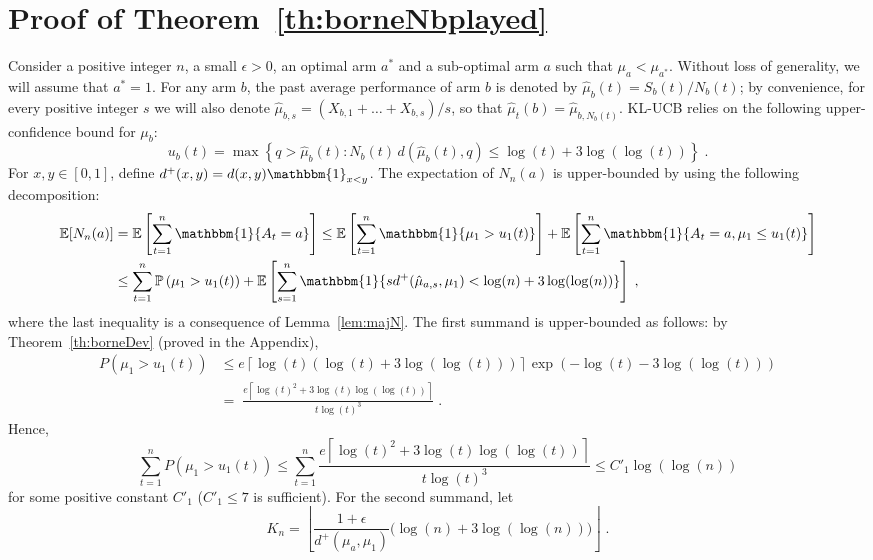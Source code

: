\documentclass[wcp]{jmlr}
\newcommand{\E}{\mathbb{E}}
\renewcommand{\P}{\mathbb{P}}
\newcommand{\1}{\mathbbm{1}}
\begin{document}
{\section{Proof of Theorem~\ref{th:borneNbplayed}}\label{sec:proof}
Consider a positive integer $n$, a small $\epsilon>0$, an optimal arm $a^*$ and
a sub-optimal arm $a$ such that $\mu_a < \mu_{a^*}$.  Without loss of
generality, we will assume that $a^* = 1$. For any arm $b$, the past average performance of arm $b$ is denoted
by $\hat{\mu}_b(t) = S_b(t) / N_b(t)$; by convenience, for every positive
integer $s$ we will also denote $\hat{\mu}_{b,s} = \left( X_{b,1} + \dots +
  X_{b,s} \right)/s$, so that $\hat{\mu}_t(b) = \hat{\mu}_{b,N_b(t)}$. KL-UCB
relies on the following upper-confidence bound for $\mu_b$:
\[u_b(t) = \max \left\{q>\hat{\mu}_b(t) : N_b(t)\,d\left( \hat{\mu}_b(t), q
  \right) \leq \log(t) + 3\log(\log(t))\right\}\;.\]
For $x,y\in[0,1]$, define $d^+(x,y) = d(x,y)\1_{x<y}$.
The expectation of $N_n(a)$ is upper-bounded by using the following
decomposition:
\begin{align*}
  \E[N_n(a)] & = \E\left[\sum_{t=1}^n \1\{A_t = a\}\right]\leq \E\left[\sum_{t=1}^n \1\{\mu_1>u_1(t)\}\right] + \E\left[\sum_{t=1}^n \1\{A_t = a, \mu_1\leq u_1(t)\}\right] \\
  & \leq \sum_{t=1}^n \P\left(\mu_1>u_1(t)\right) + \E\left[ \sum_{s = 1}^n
    \1\{ sd^+(\hat{\mu}_{a,s}, \mu_1) < \log(n) + 3\log(\log(n))\}\right]\;,
\end{align*}
where the last inequality is a consequence of Lemma~\ref{lem:majN}.  The first
summand is upper-bounded as
follows: %
by Theorem~\ref{th:borneDev} (proved in the Appendix),
\begin{align*}
  P(\mu_1>u_1(t))& \leq e\left\lceil \log(t)\left( \log(t) + 3\log(\log(t))
    \right)\right\rceil \exp(-\log(t) - 3\log(\log(t))) \\&= \;
  \frac{e\left\lceil \log(t)^2 + 3\log(t)\log(\log(t))\right\rceil}{t
    \log(t)^3}\;.
\end{align*}
Hence,
\[ \sum_{t=1}^n P(\mu_1>u_1(t)) \leq \sum_{t=1}^n \frac{e\left\lceil \log(t)^2
    + 3\log(t)\log(\log(t)) \right\rceil}{t\log(t)^3} \leq C'_1 \log(\log(n))
\]
for some positive constant $C'_1$ ($C'_1\leq 7$ is sufficient).
For the second summand, let 
 \[K_n = \left\lfloor\frac{1+\epsilon}{d^+(\mu_a, \mu_1)}\Big(  \log(n)+3\log(\log(n)) \Big)\right\rfloor\;.\]
}
\end{document}
